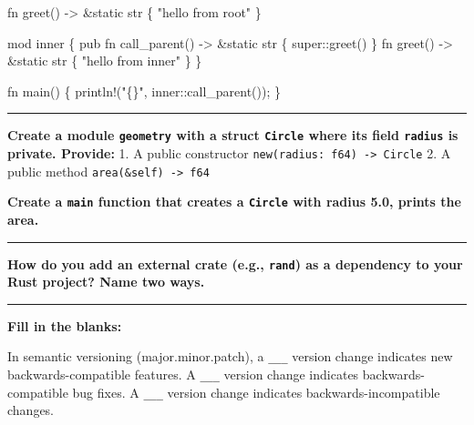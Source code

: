 \documentclass[
  11pt,
]{article}
\newenvironment{Shaded}{}{}
\newcommand{\NormalTok}[1]{#1}
\begin{document}
\begin{Shaded}
\begin{Highlighting}[]
\NormalTok{fn greet() {-}\textgreater{} \&\textquotesingle{}static str \{}
\NormalTok{    "hello from root"}
\NormalTok{\}}

\NormalTok{mod inner \{}
\NormalTok{    pub fn call\_parent() {-}\textgreater{} \&\textquotesingle{}static str \{}
\NormalTok{        super::greet()}
\NormalTok{    \}}
\NormalTok{    fn greet() {-}\textgreater{} \&\textquotesingle{}static str \{}
\NormalTok{        "hello from inner"}
\NormalTok{    \}}
\NormalTok{\}}

\NormalTok{fn main() \{}
\NormalTok{    println!("\{\}", inner::call\_parent());}
\NormalTok{\}}
\end{Highlighting}
\end{Shaded}

\begin{center}\rule{0.5\linewidth}{0.5pt}\end{center}

\textbf{Create a module \texttt{geometry} with a struct \texttt{Circle}
where its field \texttt{radius} is private. Provide:} 1. A public
constructor \texttt{new(radius:\ f64)\ -\textgreater{}\ Circle} 2. A
public method \texttt{area(\&self)\ -\textgreater{}\ f64}

\textbf{Create a \texttt{main} function that creates a \texttt{Circle}
with radius 5.0, prints the area.}

\begin{Shaded}
\begin{Highlighting}[]

\end{Highlighting}
\end{Shaded}

\begin{center}\rule{0.5\linewidth}{0.5pt}\end{center}

\textbf{How do you add an external crate (e.g., \texttt{rand}) as a
dependency to your Rust project? Name two ways.}

\begin{center}\rule{0.5\linewidth}{0.5pt}\end{center}

\textbf{Fill in the blanks:}

In semantic versioning (major.minor.patch), a \texttt{\_\_\_} version
change indicates new backwards-compatible features. A \texttt{\_\_\_}
version change indicates backwards-compatible bug fixes. A
\texttt{\_\_\_} version change indicates backwards-incompatible changes.
\end{document}

